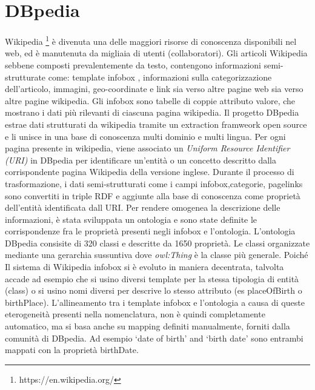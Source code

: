 \section{DBpedia}
Wikipedia \footnote{https://en.wikipedia.org/} è divenuta una delle maggiori risorse di conoscenza disponibili nel web, ed è manutenuta da migliaia di utenti (collaboratori). Gli articoli Wikipedia sebbene composti prevalentemente da testo, contengono informazioni semi-strutturate come: template infobox , informazioni sulla categorizzazione dell'articolo, immagini, geo-coordinate e link sia verso altre pagine web sia verso altre pagine wikipedia.
Gli infobox sono tabelle di coppie attributo valore, che mostrano i dati più rilevanti di ciascuna pagina wikipedia. Il progetto DBpedia \cite{Bizer:2009:DCP:1640541.1640848} estrae dati strutturati da wikipedia tramite un extraction framweork open source e li unisce in una base di conoscenza multi dominio e multi lingua. Per ogni pagina presente in wikipedia, viene associato un \emph{Uniform Resource Identifier (URI)} in DBpedia per identificare un'entità o un concetto descritto dalla corrispondente pagina Wikipedia della versione inglese. Durante il processo di trasformazione, i dati semi-strutturati come i campi infobox,categorie, pagelinks sono convertiti in triple RDF e aggiunte alla base di conoscenza come proprietà dell'entità identificata dall URI.  Per rendere omogenea la descrizione delle informazioni, è stata sviluppata un ontologia e sono state definite le corrispondenze fra le proprietà presenti negli infobox e l'ontologia.
L'ontologia DBpedia consisite di 320 classi e descritte da 1650 proprietà. Le classi organizzate mediante una gerarchia sussuntiva dove \emph{owl:Thing} è la classe più generale. Poiché Il sistema di Wikipedia infobox si è evoluto in maniera decentrata, talvolta accade ad esempio che si usino diversi template per la stessa tipologia di entità (class) o si usino nomi diversi per descrive lo stesso attributo (es placeOfBirth o birthPlace). 
 L'allineamento tra i template infobox e l'ontologia a causa di queste eterogeneità presenti nella nomenclatura, non è quindi completamente automatico, ma si basa anche su mapping definiti manualmente, forniti dalla comunità di DBpedia. Ad esempio ‘date of birth’ and ‘birth
date’ sono entrambi mappati con la proprietà birthDate. 
